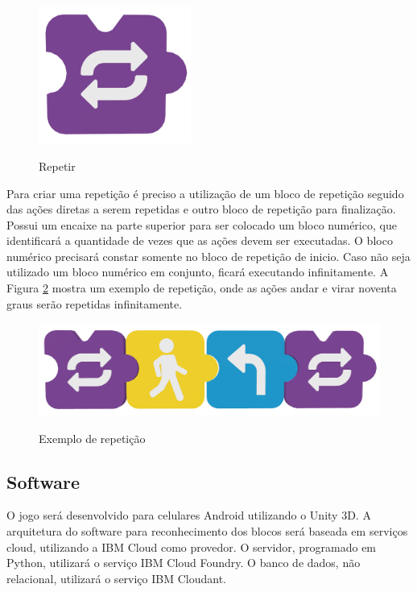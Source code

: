         \begin{figure}[H]
            \caption{Repetir}
            \centering
            \includegraphics[width=5cm]{Imagens/Cap3/Blocos/Repetir.png}
            \label{figura:repetir}
        \end{figure}
        
        Para criar uma repetição é preciso a utilização de um bloco de repetição seguido das ações diretas a serem repetidas e outro bloco de repetição para finalização. Possui um encaixe na parte superior para ser colocado um bloco numérico, que identificará a quantidade de vezes que as ações devem ser executadas. O bloco numérico precisará constar somente no bloco de repetição de inicio. Caso não seja utilizado um bloco numérico em conjunto, ficará executando infinitamente. A Figura \ref{figura:exemplo_repeticao} mostra um exemplo de repetição, onde as ações andar e virar noventa graus serão repetidas infinitamente.
        
        \begin{figure}[H]
            \caption{Exemplo de repetição}
            \centering
            \includegraphics[width=\linewidth]{Imagens/Cap3/Blocos/Exemplo_Repeticao.png}
            \label{figura:exemplo_repeticao}
        \end{figure}
    
    \subsection{Software}
    O jogo será desenvolvido para celulares Android utilizando o Unity 3D. A arquitetura do software para reconhecimento dos blocos será baseada em serviços cloud, utilizando a IBM Cloud como provedor.
    O servidor, programado em Python, utilizará o serviço IBM Cloud Foundry. O banco de dados, não relacional, utilizará o serviço IBM Cloudant.
    
